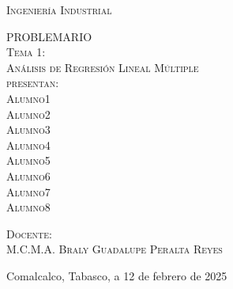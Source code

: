 \begin{titlepage}
\begin{minipage}[c][0.81\textheight][t]{0.75\textwidth}
\begin{center}
			{\large\scshape Ingeniería Industrial}\\[.2in]
			
			\vspace{1.0cm}            
			
			\textsc{\LARGE P\hspace{0.4cm}R\hspace{0.4cm}O\hspace{0.4cm}B\hspace{0.4cm}L\hspace{0.4cm}E\hspace{0.4cm}M\hspace{0.4cm}A\hspace{0.4cm}R\hspace{0.4cm}I\hspace{0.4cm}O}\\[0.5cm]
			\textsc{\large Tema 1:}\\[0.5cm]
			\textsc{\large Análisis de Regresión Lineal Múltiple}\\[0.5cm]
			\textsc{\large presentan:}\\[0.5cm]
			\textsc{\large {Alumno1\\Alumno2\\Alumno3\\Alumno4\\Alumno5\\Alumno6\\Alumno7\\Alumno8}}\\[2cm]          
			
			\vspace{0.4cm}
			
			{\large\scshape Docente:\\[0.3cm] {M.C.M.A. Braly Guadalupe Peralta Reyes }}\\[.2in]
			
			\vspace{0.4cm}
			
			\large{Comalcalco, Tabasco,}{ }{a 12 de febrero de 2025}
		\end{center}
	\end{minipage}
\end{titlepage}